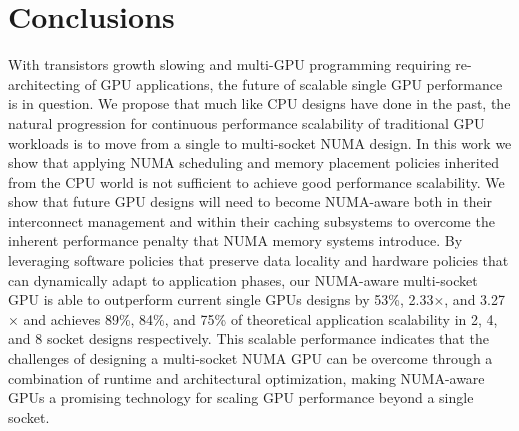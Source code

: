 \section{Conclusions}
\label{conclusions}
With transistors growth slowing and multi-GPU programming requiring 
re-architecting of GPU applications, the future of scalable single GPU 
performance is in question.  We propose that much like CPU designs have done in 
the past, the natural progression for continuous performance scalability of 
traditional GPU workloads is to move from a single to multi-socket NUMA design.  
In this work we show 
that applying NUMA scheduling and memory placement policies inherited 
from the CPU world is not sufficient to achieve good performance scalability.  
We show that future GPU designs will need to become NUMA-aware both in their 
interconnect management and within their caching subsystems to overcome the 
inherent performance penalty that NUMA memory systems introduce.  By leveraging 
software policies that preserve data locality and hardware policies that can 
dynamically adapt to application phases, our NUMA-aware multi-socket GPU is able to 
outperform current single GPUs designs by 53\%, 2.33$\times$, and 3.27$\times$ and 
achieves 89\%, 84\%, and 75\% of theoretical application scalability in 2, 4, 
and 8 socket designs respectively.  This scalable performance indicates that the 
challenges of designing a multi-socket NUMA GPU can be overcome through a combination
of runtime and architectural optimization, making 
NUMA-aware GPUs a promising technology for scaling GPU performance beyond a 
single socket.


